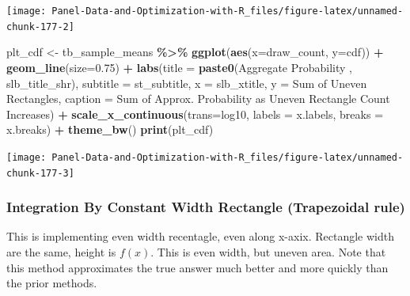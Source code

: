 \documentclass[
]{book}
\newenvironment{Shaded}{\begin{snugshade}}{\end{snugshade}}
\newcommand{\DataTypeTok}[1]{\textcolor[rgb]{0.13,0.29,0.53}{#1}}
\newcommand{\FloatTok}[1]{\textcolor[rgb]{0.00,0.00,0.81}{#1}}
\newcommand{\KeywordTok}[1]{\textcolor[rgb]{0.13,0.29,0.53}{\textbf{#1}}}
\newcommand{\NormalTok}[1]{#1}
\newcommand{\OperatorTok}[1]{\textcolor[rgb]{0.81,0.36,0.00}{\textbf{#1}}}
\newcommand{\StringTok}[1]{\textcolor[rgb]{0.31,0.60,0.02}{#1}}
\begin{document}
\begin{center}\texttt{[image: Panel-Data-and-Optimization-with-R\_files/figure-latex/unnamed-chunk-177-2]} \end{center}

\begin{Shaded}
\begin{Highlighting}[]
\NormalTok{plt\_cdf \textless{}{-}}\StringTok{ }\NormalTok{tb\_sample\_means }\OperatorTok{\%\textgreater{}\%}
\StringTok{  }\KeywordTok{ggplot}\NormalTok{(}\KeywordTok{aes}\NormalTok{(}\DataTypeTok{x=}\NormalTok{draw\_count, }\DataTypeTok{y=}\NormalTok{cdf)) }\OperatorTok{+}
\StringTok{  }\KeywordTok{geom\_line}\NormalTok{(}\DataTypeTok{size=}\FloatTok{0.75}\NormalTok{) }\OperatorTok{+}
\StringTok{  }\KeywordTok{labs}\NormalTok{(}\DataTypeTok{title =} \KeywordTok{paste0}\NormalTok{(}\StringTok{\textquotesingle{}Aggregate Probability \textquotesingle{}}\NormalTok{, slb\_title\_shr),}
       \DataTypeTok{subtitle =}\NormalTok{ st\_subtitle,}
       \DataTypeTok{x =}\NormalTok{ slb\_xtitle,}
       \DataTypeTok{y =} \StringTok{\textquotesingle{}Sum of Uneven Rectangles\textquotesingle{}}\NormalTok{,}
       \DataTypeTok{caption =} \StringTok{\textquotesingle{}Sum of Approx. Probability as Uneven Rectangle Count Increases\textquotesingle{}}\NormalTok{) }\OperatorTok{+}
\StringTok{  }\KeywordTok{scale\_x\_continuous}\NormalTok{(}\DataTypeTok{trans=}\StringTok{\textquotesingle{}log10\textquotesingle{}}\NormalTok{, }\DataTypeTok{labels =}\NormalTok{ x.labels, }\DataTypeTok{breaks =}\NormalTok{ x.breaks) }\OperatorTok{+}
\StringTok{  }\KeywordTok{theme\_bw}\NormalTok{()}
\KeywordTok{print}\NormalTok{(plt\_cdf)}
\end{Highlighting}
\end{Shaded}

\begin{center}\texttt{[image: Panel-Data-and-Optimization-with-R\_files/figure-latex/unnamed-chunk-177-3]} \end{center}

\hypertarget{integration-by-constant-width-rectangle-trapezoidal-rule}{%
\subsubsection{Integration By Constant Width Rectangle (Trapezoidal rule)}\label{integration-by-constant-width-rectangle-trapezoidal-rule}}

This is implementing even width recentagle, even along x-axix. Rectangle width are the same, height is \(f(x)\). This is even width, but uneven area. Note that this method approximates the true answer much better and more quickly than the prior methods.
\end{document}
